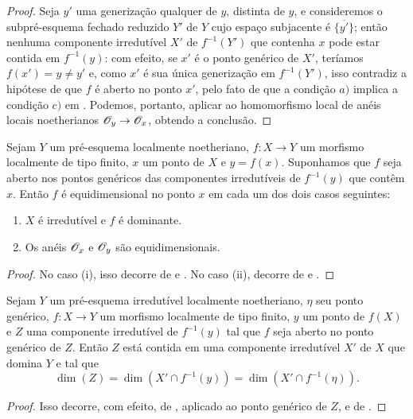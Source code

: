 \begin{proof}
Seja $y'$ uma generização qualquer de $y$, distinta de $y$, e consideremos o subpré-esquema fechado reduzido $Y'$ de $Y$ cujo espaço subjacente é $\overline{\{y'\}}$; então nenhuma componente irredutível $X'$ de $f^{-1}(Y')$ que contenha $x$ pode estar contida em $f^{-1}(y)$: com efeito, se $x'$ é o ponto genérico de $X'$, teríamos $f(x')=y\neq y'$ e, como $x'$ é sua única generização em $f^{-1}(Y')$, isso contradiz a hipótese de que $f$ é aberto no ponto $x'$, pelo fato de que a condição $a)$ implica a condição $c)$ em .
Podemos, portanto, aplicar  ao homomorfismo local de anéis locais noetherianos $\sh{O}_y\to\sh{O}_x$, obtendo a conclusão.
\end{proof}

\begin{corollary}[14.2.2]
\label{IV.14.2.2}
Sejam $Y$ um pré-esquema localmente noetheriano, $f:X\to Y$ um morfismo localmente de tipo finito, $x$ um ponto de $X$ e $y=f(x)$.
Suponhamos que $f$ seja aberto nos pontos genéricos das componentes irredutíveis de $f^{-1}(y)$ que contêm $x$.
Então $f$ é equidimensional no ponto $x$ em cada um dos dois casos seguintes:
\begin{enumerate}[label=(\roman*)]
  \item $X$ é irredutível e $f$ é dominante.
  \item Os anéis $\mathscr{O}_x$ e $\mathscr{O}_y$ são equidimensionais.
\end{enumerate}
\end{corollary}

\begin{proof}
No caso (i), isso decorre de  e .
No caso (ii), decorre de  e .
\end{proof}

\begin{proposition}[14.2.3]
\label{IV.14.2.3}
Sejam $Y$ um pré-esquema irredutível localmente noetheriano, $\eta$ seu ponto genérico, $f:X\to Y$ um morfismo localmente de tipo finito, $y$ um ponto de $f(X)$ e $Z$ uma componente irredutível de $f^{-1}(y)$ tal que $f$ seja aberto no ponto genérico de $Z$.
Então $Z$ está contida em uma componente irredutível $X'$ de $X$ que domina $Y$ e tal que
\[
  \dim(Z)=\dim(X'\cap f^{-1}(y))=\dim(X'\cap f^{-1}(\eta)).
\]
\end{proposition}

\begin{proof}
Isso decorre, com efeito, de , aplicado ao ponto genérico de $Z$, e de .
\end{proof}

